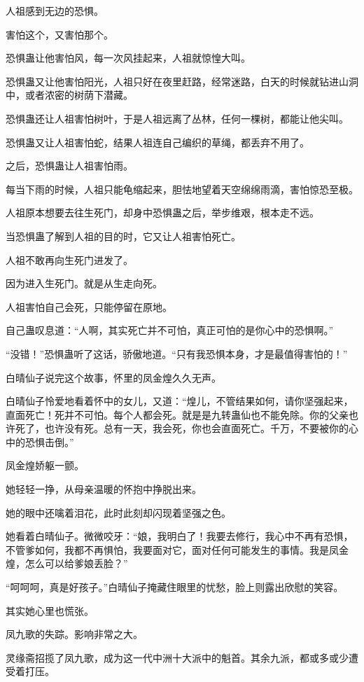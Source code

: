 \begin{this_body}
人祖感到无边的恐惧。

害怕这个，又害怕那个。

恐惧蛊让他害怕风，每一次风挂起来，人祖就惊惶大叫。

恐惧蛊又让他害怕阳光，人祖只好在夜里赶路，经常迷路，白天的时候就钻进山洞中，或者浓密的树荫下潜藏。

恐惧蛊还让人祖害怕树叶，于是人祖远离了丛林，任何一棵树，都能让他尖叫。

恐惧蛊又让人祖害怕蛇，结果人祖连自己编织的草绳，都丢弃不用了。

之后，恐惧蛊让人祖害怕雨。

每当下雨的时候，人祖只能龟缩起来，胆怯地望着天空绵绵雨滴，害怕惊恐至极。

人祖原本想要去往生死门，却身中恐惧蛊之后，举步维艰，根本走不远。

当恐惧蛊了解到人祖的目的时，它又让人祖害怕死亡。

人祖不敢再向生死门进发了。

因为进入生死门。就是从生走向死。

人祖害怕自己会死，只能停留在原地。

自己蛊叹息道：“人啊，其实死亡并不可怕，真正可怕的是你心中的恐惧啊。”

“没错！”恐惧蛊听了这话，骄傲地道。“只有我恐惧本身，才是最值得害怕的！”

白晴仙子说完这个故事，怀里的凤金煌久久无声。

白晴仙子怜爱地看着怀中的女儿，又道：“煌儿，不管结果如何，请你坚强起来，直面死亡！死并不可怕。每个人都会死。就是是九转蛊仙也不能免除。你的父亲也许死了，也许没有死。总有一天，我会死，你也会直面死亡。千万，不要被你的心中的恐惧击倒。”

凤金煌娇躯一颤。

她轻轻一挣，从母亲温暖的怀抱中挣脱出来。

她的眼中还噙着泪花，此时此刻却闪现着坚强之色。

她看着白晴仙子。微微咬牙：“娘，我明白了！我要去修行，我心中不再有恐惧，不管爹如何，我都不再惧怕，我要面对它，面对任何可能发生的事情。我是凤金煌，怎么可以给爹娘丢脸？”

“呵呵呵，真是好孩子。”白晴仙子掩藏住眼里的忧愁，脸上则露出欣慰的笑容。

其实她心里也慌张。

凤九歌的失踪。影响非常之大。

灵缘斋招揽了凤九歌，成为这一代中洲十大派中的魁首。其余九派，都或多或少遭受着打压。


\end{this_body}
